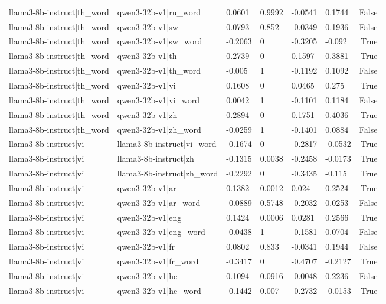 \begin{table}
\begin{tabular}{llllllr}
llama3-8b-instruct|th_word & qwen3-32b-v1|ru_word & 0.0601 & 0.9992 & -0.0541 & 0.1744 & False \\
llama3-8b-instruct|th_word & qwen3-32b-v1|sw & 0.0793 & 0.852 & -0.0349 & 0.1936 & False \\
llama3-8b-instruct|th_word & qwen3-32b-v1|sw_word & -0.2063 & 0 & -0.3205 & -0.092 & True \\
llama3-8b-instruct|th_word & qwen3-32b-v1|th & 0.2739 & 0 & 0.1597 & 0.3881 & True \\
llama3-8b-instruct|th_word & qwen3-32b-v1|th_word & -0.005 & 1 & -0.1192 & 0.1092 & False \\
llama3-8b-instruct|th_word & qwen3-32b-v1|vi & 0.1608 & 0 & 0.0465 & 0.275 & True \\
llama3-8b-instruct|th_word & qwen3-32b-v1|vi_word & 0.0042 & 1 & -0.1101 & 0.1184 & False \\
llama3-8b-instruct|th_word & qwen3-32b-v1|zh & 0.2894 & 0 & 0.1751 & 0.4036 & True \\
llama3-8b-instruct|th_word & qwen3-32b-v1|zh_word & -0.0259 & 1 & -0.1401 & 0.0884 & False \\
llama3-8b-instruct|vi & llama3-8b-instruct|vi_word & -0.1674 & 0 & -0.2817 & -0.0532 & True \\
llama3-8b-instruct|vi & llama3-8b-instruct|zh & -0.1315 & 0.0038 & -0.2458 & -0.0173 & True \\
llama3-8b-instruct|vi & llama3-8b-instruct|zh_word & -0.2292 & 0 & -0.3435 & -0.115 & True \\
llama3-8b-instruct|vi & qwen3-32b-v1|ar & 0.1382 & 0.0012 & 0.024 & 0.2524 & True \\
llama3-8b-instruct|vi & qwen3-32b-v1|ar_word & -0.0889 & 0.5748 & -0.2032 & 0.0253 & False \\
llama3-8b-instruct|vi & qwen3-32b-v1|eng & 0.1424 & 0.0006 & 0.0281 & 0.2566 & True \\
llama3-8b-instruct|vi & qwen3-32b-v1|eng_word & -0.0438 & 1 & -0.1581 & 0.0704 & False \\
llama3-8b-instruct|vi & qwen3-32b-v1|fr & 0.0802 & 0.833 & -0.0341 & 0.1944 & False \\
llama3-8b-instruct|vi & qwen3-32b-v1|fr_word & -0.3417 & 0 & -0.4707 & -0.2127 & True \\
llama3-8b-instruct|vi & qwen3-32b-v1|he & 0.1094 & 0.0916 & -0.0048 & 0.2236 & False \\
llama3-8b-instruct|vi & qwen3-32b-v1|he_word & -0.1442 & 0.007 & -0.2732 & -0.0153 & True \\

\end{tabular}
\end{table}
